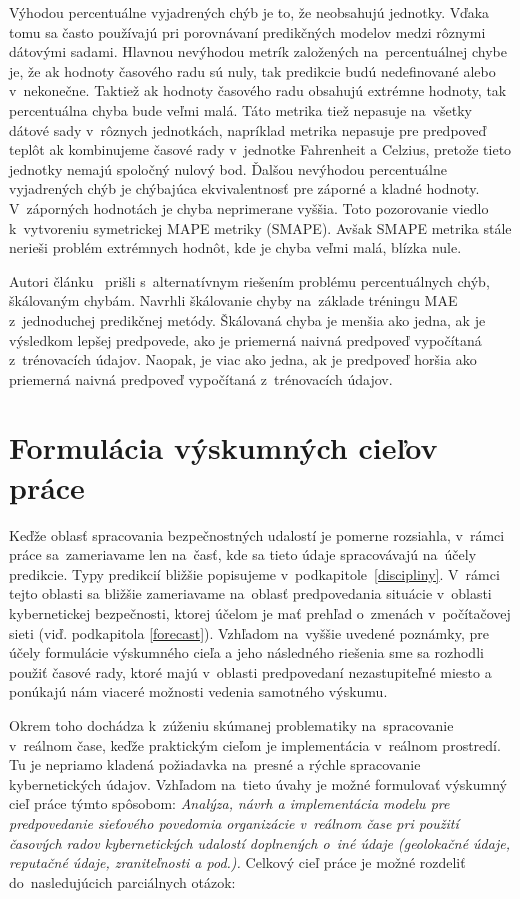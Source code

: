 \documentclass[thesismargins, thesislinespacing, openright, upjsfrontpage]{rnthesis}
\begin{document}
Výhodou percentuálne vyjadrených chýb je to, že neobsahujú jednotky. Vďaka tomu sa často používajú pri porovnávaní predikčných modelov medzi rôznymi dátovými sadami. Hlavnou nevýhodou metrík založených na~percentuálnej chybe je, že ak hodnoty časového radu sú nuly, tak predikcie budú nedefinované alebo v~nekonečne. Taktiež ak hodnoty časového radu obsahujú extrémne hodnoty, tak percentuálna chyba bude veľmi malá. Táto metrika tiež nepasuje na~všetky dátové sady v~rôznych jednotkách, napríklad metrika nepasuje pre predpoveď teplôt ak kombinujeme časové rady v~jednotke Fahrenheit a Celzius, pretože tieto jednotky nemajú spoločný nulový bod. Ďalšou nevýhodou percentuálne vyjadrených chýb je chýbajúca ekvivalentnosť pre záporné a kladné hodnoty. V~záporných hodnotách je chyba neprimerane vyššia. Toto pozorovanie viedlo k~vytvoreniu symetrickej MAPE metriky \cite{armstrong1985crystal} (SMAPE). Avšak SMAPE metrika stále nerieši problém extrémnych hodnôt, kde je chyba veľmi malá, blízka nule. 

Autori článku~\cite{hyndman2006another} prišli s~alternatívnym riešením problému percentuálnych chýb, škálovaným chybám. Navrhli škálovanie chyby na~základe tréningu MAE z~jednoduchej predikčnej metódy. Škálovaná chyba je menšia ako jedna, ak je výsledkom lepšej predpovede, ako je priemerná naivná predpoveď vypočítaná z~trénovacích údajov. Naopak, je viac ako jedna, ak je predpoveď horšia ako priemerná naivná predpoveď vypočítaná z~trénovacích údajov.

\section{Formulácia výskumných cieľov práce}

Keďže oblasť spracovania bezpečnostných udalostí je pomerne rozsiahla, v~rámci práce sa~zameriavame len na~časť, kde sa tieto údaje spracovávajú na~účely predikcie. Typy predikcií bližšie popisujeme v~podkapitole~\ref{discipliny}. V~rámci tejto oblasti sa bližšie zameriavame na~oblasť predpovedania situácie v~oblasti kybernetickej bezpečnosti, ktorej účelom je mať prehľad o~zmenách v~počítačovej sieti (viď. podkapitola \ref{forecast}). Vzhľadom na~vyššie uvedené poznámky, pre účely formulácie výskumného cieľa a jeho následného riešenia sme sa rozhodli použiť časové rady, ktoré majú v~oblasti predpovedaní nezastupiteľné miesto a ponúkajú nám viaceré možnosti vedenia samotného výskumu. 

Okrem toho dochádza k~zúženiu skúmanej problematiky na~spracovanie v~reálnom čase, keďže praktickým cieľom je implementácia v~reálnom prostredí. Tu je nepriamo kladená požiadavka na~presné a rýchle spracovanie kybernetických údajov. Vzhľadom na~tieto úvahy je možné formulovať výskumný cieľ práce týmto spôsobom: \textit{Analýza, návrh a implementácia modelu pre predpovedanie sieťového povedomia organizácie v~reálnom čase pri použití časových radov kybernetických udalostí doplnených o~iné údaje (geolokačné údaje, reputačné údaje, zraniteľnosti a pod.).} Celkový cieľ práce je možné rozdeliť do~nasledujúcich parciálnych otázok:
\end{document}
